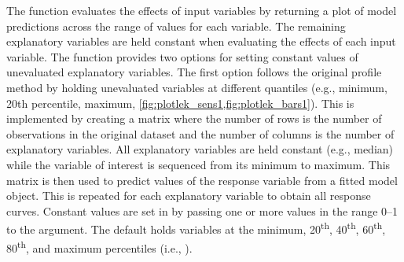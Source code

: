 \documentclass[article,shortnames]{jss}
\begin{document}
The  function evaluates the effects of input variables by returning a plot of model predictions across the range of values for each variable.  The remaining explanatory variables are held constant when evaluating the effects of each input variable.  The  function provides two options for setting constant values of unevaluated explanatory variables.  The first option follows the original profile method by holding unevaluated variables at different quantiles (e.g., minimum, 20th percentile, maximum, \cref{fig:plotlek_sens1,fig:plotlek_bars1}). This is implemented by creating a matrix where the number of rows is the number of observations in the original dataset and the number of columns is the number of explanatory variables. All explanatory variables are held constant (e.g., median) while the variable of interest is sequenced from its minimum to maximum. This matrix is then used to predict values of the response variable from a fitted model object. This is repeated for each explanatory variable to obtain all response curves.  Constant values are set in  by passing one or more values in the range 0--1 to the  argument.  The default holds variables at the minimum, 20\textsuperscript{th}, 40\textsuperscript{th}, 60\textsuperscript{th}, 80\textsuperscript{th}, and maximum percentiles (i.e., ).  
\end{document}
